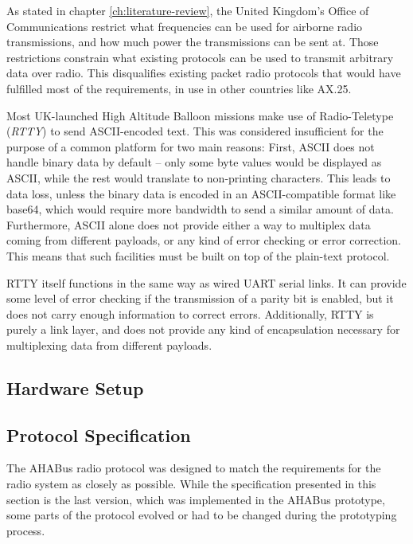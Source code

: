 As stated in chapter \ref{ch:literature-review}, the United Kingdom's Office
of Communications restrict what frequencies can be used for airborne
radio transmissions, and how much power the transmissions can be sent at.
Those restrictions constrain what existing protocols can be used to transmit
arbitrary data over radio. This disqualifies existing packet radio protocols
that would have fulfilled most of the requirements, in use in other countries
like AX.25.

Most UK-launched High Altitude Balloon missions make use of Radio-Teletype
(\textit{RTTY}) to send ASCII-encoded text. This was considered insufficient
for the purpose of a common platform for two main reasons: First, ASCII does
not handle binary data by default -- only some byte values would be displayed
as ASCII, while the rest would translate to non-printing characters. This leads
to data loss, unless the binary data is encoded in an ASCII-compatible format
like base64, which would require more bandwidth to send a similar amount of
data. Furthermore, ASCII alone does not provide either a way to multiplex data
coming from different payloads, or any kind of error checking or error
correction. This means that such facilities must be built on top of the
plain-text protocol.

RTTY itself functions in the same way as wired UART serial links. It can provide
some level of error checking if the transmission of a parity bit is enabled, but
it does not carry enough information to correct errors. Additionally, RTTY is
purely a link layer, and does not provide any kind of encapsulation necessary
for multiplexing data from different payloads.

\subsection{Hardware Setup}

\subsection{Protocol Specification}

The AHABus radio protocol was designed to match the requirements for the radio
system as closely as possible. While the specification presented in this section
is the last version, which was implemented in the AHABus prototype, some parts
of the protocol evolved or had to be changed during the prototyping process.

